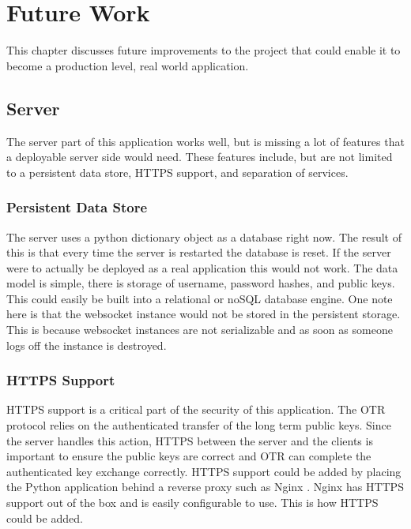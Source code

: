 

\chapter{Future Work}


This chapter discusses future improvements to the project that could enable it to become a production level, real world application.


\section{Server}


The server part of this application works well, but is missing a lot of features that a deployable server side would need. These features include, but are not limited to a persistent data store, HTTPS support, and separation of services.


\subsection{Persistent Data Store}


The server uses a python dictionary object as a database right now. The result of this is that every time the server is restarted the database is reset. If the server were to actually be deployed as a real application this would not work. The data model is simple, there is storage of username, password hashes, and public keys. This could easily be built into a relational or noSQL database engine. One note here is that the websocket instance would not be stored in the persistent storage. This is because websocket instances are not serializable and as soon as someone logs off the instance is destroyed.


\subsection{HTTPS Support}


HTTPS support is a critical part of the security of this application. The OTR protocol relies on the authenticated transfer of the long term public keys. Since the server handles this action, HTTPS between the server and the clients is important to ensure the public keys are correct and OTR can complete the authenticated key exchange correctly. HTTPS support could be added by placing the Python application behind a reverse proxy such as Nginx \cite{nginx}. Nginx has HTTPS support out of the box and is easily configurable to use. This is how HTTPS could be added.


